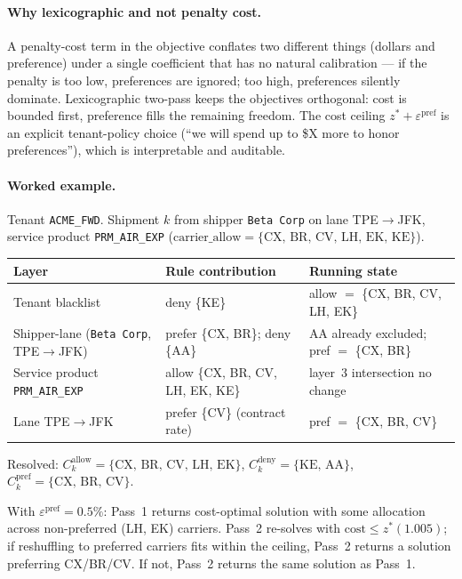 \documentclass[11pt,a4paper]{article}
\theoremstyle{definition}
\begin{document}
\paragraph{Why lexicographic and not penalty cost.}
A penalty-cost term in the objective conflates two different things (dollars and
preference) under a single coefficient that has no natural calibration --- if the
penalty is too low, preferences are ignored; too high, preferences silently
dominate. Lexicographic two-pass keeps the objectives orthogonal: cost is bounded
first, preference fills the remaining freedom. The cost ceiling
$z^* + \varepsilon^{\text{pref}}$ is an explicit tenant-policy choice (``we will
spend up to \$X more to honor preferences''), which is interpretable and auditable.

\paragraph{Worked example.}
Tenant \texttt{ACME\_FWD}. Shipment $k$ from shipper \texttt{Beta Corp} on lane
TPE$\to$JFK, service product \texttt{PRM\_AIR\_EXP} ($\text{carrier\_allow} =
\{\text{CX, BR, CV, LH, EK, KE}\}$).
\begin{center}
\begin{tabular}{lp{4cm}l}
\toprule
Layer & Rule contribution & Running state \\
\midrule
Tenant blacklist & deny \{KE\} & allow $=$ \{CX, BR, CV, LH, EK\} \\
Shipper-lane (\texttt{Beta Corp}, TPE$\to$JFK) & prefer \{CX, BR\}; deny \{AA\} & AA already excluded; pref $=$ \{CX, BR\} \\
Service product \texttt{PRM\_AIR\_EXP} & allow \{CX, BR, CV, LH, EK, KE\} & layer~3 intersection no change \\
Lane TPE$\to$JFK & prefer \{CV\} (contract rate) & pref $=$ \{CX, BR, CV\} \\
\bottomrule
\end{tabular}
\end{center}
Resolved: $C_k^{\text{allow}} = \{\text{CX, BR, CV, LH, EK}\}$,
$C_k^{\text{deny}} = \{\text{KE, AA}\}$, $C_k^{\text{pref}} = \{\text{CX, BR, CV}\}$.

With $\varepsilon^{\text{pref}} = 0.5\%$: Pass~1 returns cost-optimal solution with
some allocation across non-preferred (LH, EK) carriers. Pass~2 re-solves with
$\text{cost} \leq z^*(1.005)$; if reshuffling to preferred carriers fits within the
ceiling, Pass~2 returns a solution preferring CX/BR/CV. If not, Pass~2 returns the
same solution as Pass~1.
\end{document}
